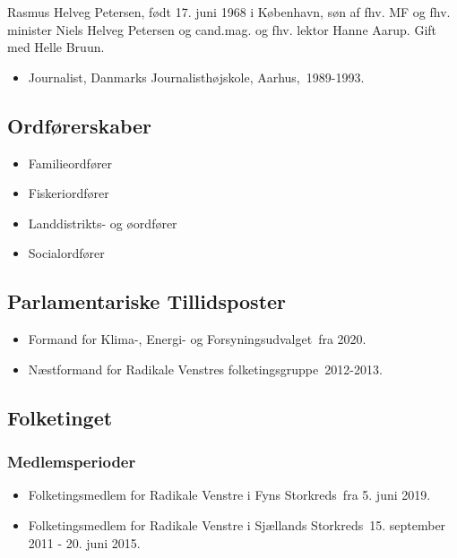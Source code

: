 \documentclass[11pt, a4paper]{awesome-cv}
\begin{document}
\makecvheader[R]
\makelettertitle
\begin{cvletter}
Rasmus Helveg Petersen, født 17. juni 1968 i København, søn af fhv. MF og fhv. minister Niels Helveg Petersen og cand.mag. og fhv. lektor Hanne Aarup. Gift med Helle Bruun.

\begin{itemize}
\item Journalist, Danmarks Journalisthøjskole, Aarhus, 1989-1993.
\end{itemize}
\subsection*{Ordførerskaber}
\begin{itemize}
\item Familieordfører
\item Fiskeriordfører
\item Landdistrikts- og øordfører
\item Socialordfører
\end{itemize}
\subsection*{Parlamentariske Tillidsposter}
\begin{itemize}
\item Formand for Klima-, Energi- og Forsyningsudvalget fra 2020.
\item Næstformand for Radikale Venstres folketingsgruppe 2012-2013.
\end{itemize}
\subsection*{Folketinget}
\subsubsection*{Medlemsperioder}
\begin{itemize}
\item Folketingsmedlem for Radikale Venstre i Fyns Storkreds fra 5. juni 2019.
\item Folketingsmedlem for Radikale Venstre i Sjællands Storkreds 15. september 2011 - 20. juni 2015.
\end{itemize}

\end{cvletter}
\end{document}
